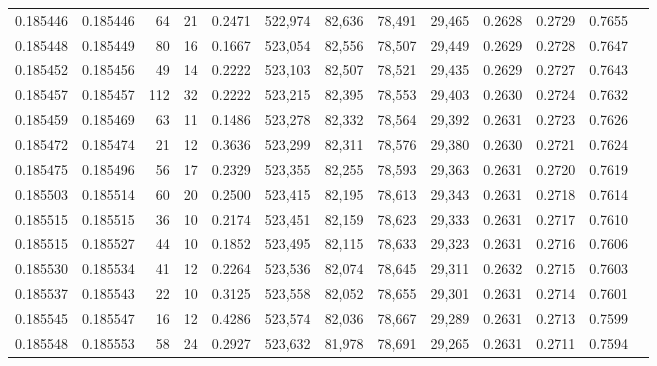 \begin{tabular}{rrrrrrrrrrrrr}
0.185446 & 0.185446 &    64 &  21 &                                     0.2471 & 522,974 &  82,636 &  78,491 &  29,465 & 0.2628 & 0.2729 & 0.7655 \\
0.185448 & 0.185449 &    80 &  16 &                                     0.1667 & 523,054 &  82,556 &  78,507 &  29,449 & 0.2629 & 0.2728 & 0.7647 \\
0.185452 & 0.185456 &    49 &  14 &                                     0.2222 & 523,103 &  82,507 &  78,521 &  29,435 & 0.2629 & 0.2727 & 0.7643 \\
0.185457 & 0.185457 &   112 &  32 &                                     0.2222 & 523,215 &  82,395 &  78,553 &  29,403 & 0.2630 & 0.2724 & 0.7632 \\
0.185459 & 0.185469 &    63 &  11 &                                     0.1486 & 523,278 &  82,332 &  78,564 &  29,392 & 0.2631 & 0.2723 & 0.7626 \\
0.185472 & 0.185474 &    21 &  12 &                                     0.3636 & 523,299 &  82,311 &  78,576 &  29,380 & 0.2630 & 0.2721 & 0.7624 \\
0.185475 & 0.185496 &    56 &  17 &                                     0.2329 & 523,355 &  82,255 &  78,593 &  29,363 & 0.2631 & 0.2720 & 0.7619 \\
0.185503 & 0.185514 &    60 &  20 &                                     0.2500 & 523,415 &  82,195 &  78,613 &  29,343 & 0.2631 & 0.2718 & 0.7614 \\
0.185515 & 0.185515 &    36 &  10 &                                     0.2174 & 523,451 &  82,159 &  78,623 &  29,333 & 0.2631 & 0.2717 & 0.7610 \\
0.185515 & 0.185527 &    44 &  10 &                                     0.1852 & 523,495 &  82,115 &  78,633 &  29,323 & 0.2631 & 0.2716 & 0.7606 \\
0.185530 & 0.185534 &    41 &  12 &                                     0.2264 & 523,536 &  82,074 &  78,645 &  29,311 & 0.2632 & 0.2715 & 0.7603 \\
0.185537 & 0.185543 &    22 &  10 &                                     0.3125 & 523,558 &  82,052 &  78,655 &  29,301 & 0.2631 & 0.2714 & 0.7601 \\
0.185545 & 0.185547 &    16 &  12 &                                     0.4286 & 523,574 &  82,036 &  78,667 &  29,289 & 0.2631 & 0.2713 & 0.7599 \\
0.185548 & 0.185553 &    58 &  24 &                                     0.2927 & 523,632 &  81,978 &  78,691 &  29,265 & 0.2631 & 0.2711 & 0.7594 \\

\end{tabular}
